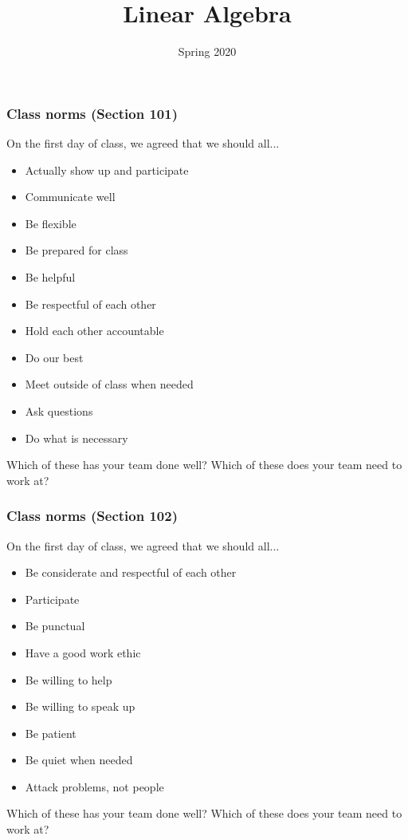 \documentclass[aspectratio=1610]{beamer}
\title{Linear Algebra}
\date{Spring 2020}
\begin{document}
\begin{frame}\frametitle{Class norms (Section 101)}
On the first day of class, we agreed that we should all...
\begin{multicols}{2}
\begin{itemize}
\item Actually show up  and participate
\item Communicate well
\item Be flexible
\item Be prepared for class
\item Be helpful 
\item Be respectful of each other
\item Hold each other accountable
\item Do our best
\item Meet outside of class when needed
\item Ask questions
\item Do what is necessary
\end{itemize}
\end{multicols}

\vfill
Which of these has your team done well? Which of these does your team need to work at?
\end{frame}


\begin{frame}\frametitle{Class norms (Section 102)}
On the first day of class, we agreed that we should all...
\begin{multicols}{2}
\begin{itemize}
\item Be considerate and respectful of each other
\item Participate
\item Be punctual
\item Have a good work ethic
\item Be willing to help
\item Be willing to speak up
\item Be patient
\item Be quiet when needed
\item Attack problems, not people
\end{itemize}
\end{multicols}

\vfill
Which of these has your team done well? Which of these does your team need to work at?
\end{frame}
\end{document}
